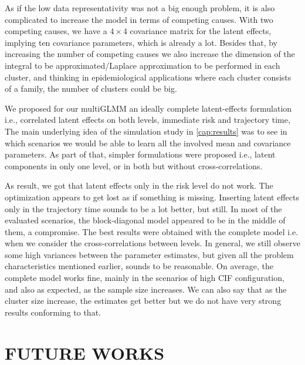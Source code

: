 As if the low data representativity was not a big enough problem, it is
also complicated to increase the model in terms of competing
causes. With two competing causes, we have a \(4\times4\) covariance
matrix for the latent effects, implying ten covariance parameters, which
is already a lot. Besides that, by increasing the number of competing
causes we also increase the dimension of the integral to be
approximated/Laplace approximation to be performed in each cluster, and
thinking in epidemiological applications where each cluster consists of
a family, the number of clusters could be big.

We proposed for our multiGLMM an ideally complete latent-effects
formulation i.e., correlated latent effects on both levels, immediate
risk and trajectory time, The main underlying idea of the simulation
study in \autoref{cap:results} was to see in which scenarios we would be
able to learn all the involved mean and covariance parameters. As part
of that, simpler formulations were proposed i.e., latent components in
only one level, or in both but without cross-correlations.

As result, we got that latent effects only in the risk level do not
work.  The optimization appears to get lost as if something is missing.
Inserting latent effects only in the trajectory time sounds to be a lot
better, but still. In most of the evaluated scenarios, the
block-diagonal model appeared to be in the middle of them, a
compromise. The best results were obtained with the complete model
i.e. when we consider the cross-correlations between levels. In general,
we still observe some high variances between the parameter estimates,
but given all the problem characteristics mentioned earlier, sounds to
be reasonable. On average, the complete model works fine, mainly in the
scenarios of high CIF configuration, and also as expected, as the sample
size increases. We can also say that as the cluster size increase, the
estimates get better but we do not have very strong results conforming
to that.

\section{FUTURE WORKS}
\label{cap:future}

\cite{mcglm}
\cite{rmcglm}

